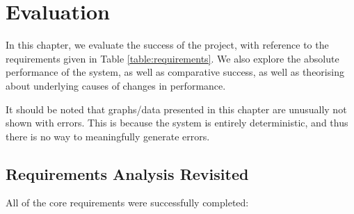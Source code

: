 \documentclass[oneside, class=book, 12pt, crop=false]{standalone}
\begin{document}
\ifstandalone
  \setcounter{chapter}{3}
  \chapter{Evaluation}
\fi
{}

In this chapter, we evaluate the success of the project, with reference to the requirements given in Table \ref{table:requirements}. We also explore the absolute performance of the system, as well as comparative success, as well as theorising about underlying causes of changes in performance. 

It should be noted that graphs/data presented in this chapter are unusually not shown with errors. This is because the system is entirely deterministic, and thus there is no way to meaningfully generate errors.

\section{Requirements Analysis Revisited}

All of the core requirements were successfully completed:
\end{document}
